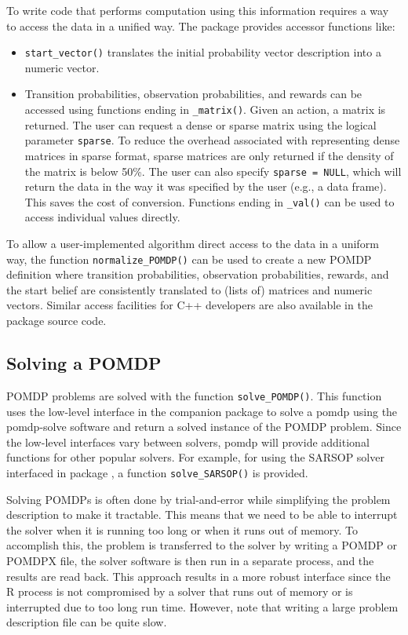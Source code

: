 To write code that performs computation using this information requires a way to access the data in a unified
way. The package provides accessor functions like:

\begin{itemize}
\item
  \texttt{start\_vector()} translates the initial probability vector description into a numeric vector.
\item
  Transition probabilities, observation probabilities, and rewards can be accessed using functions ending in \texttt{\_matrix()}.
  Given an action, a matrix is returned.
  The user can request a dense or sparse matrix using the logical parameter \texttt{sparse}.
  To reduce the overhead associated with representing dense matrices in sparse format, sparse matrices are only returned
  if the density of the matrix is below 50\%. The user can also specify \texttt{sparse\ =\ NULL},
  which will return the data in the way it was specified by the user (e.g., a data frame). This saves the cost of conversion.
  Functions ending in \texttt{\_val()} can be used to access individual values directly.
\end{itemize}

To allow a user-implemented algorithm direct access to the data in a uniform way, the function \texttt{normalize\_POMDP()} can be used to create a
new POMDP definition where transition probabilities, observation probabilities, rewards, and the start belief are
consistently translated to (lists of) matrices and numeric vectors. Similar access
facilities for C++ developers are also available in the package source code.

\subsection{Solving a POMDP}\label{solving-a-pomdp}

POMDP problems are solved with the function \texttt{solve\_POMDP()}. This function uses the low-level interface in the companion package
 to solve a pomdp using the pomdp-solve software and return a solved instance of the POMDP problem.
Since the low-level interfaces vary between solvers, pomdp will provide additional functions for other popular solvers.
For example, for using the SARSOP solver interfaced in package , a function \texttt{solve\_SARSOP()} is provided.

Solving POMDPs is often done by trial-and-error while simplifying the problem description to make it
tractable. This means that we need to be able to interrupt the solver when it is running too long or
when it runs out of memory. To accomplish this, the problem is transferred to the solver
by writing a POMDP or POMDPX file, the solver software is then run in a separate process, and the results are read back. This approach results in a more robust interface since the R process is not compromised by a solver that runs out of memory or is interrupted due to too long run time. However, note that writing a large problem description file
can be quite slow.

